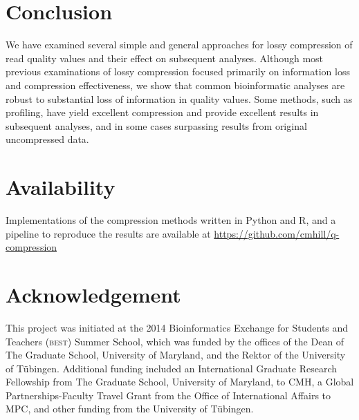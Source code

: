 \documentclass{bioinfo}
\begin{document}
%
%

\section{Conclusion}

We have examined several simple and general approaches for lossy
compression of read quality values and their effect on subsequent
analyses. Although most previous examinations of lossy compression
focused primarily on information loss and compression effectiveness,
we show that common bioinformatic analyses are robust to substantial
loss of information in quality values. Some methods, such as
profiling, have yield excellent compression and provide excellent
results in subsequent analyses, and in some cases surpassing results
from original uncompressed data.

\section{Availability}
Implementations of the compression methods written in Python and R,
and a pipeline to reproduce the results are available at
\url{https://github.com/cmhill/q-compression}

\section*{Acknowledgement}
This project was initiated at the 2014 Bioinformatics Exchange for
Students and Teachers (\textsc{best}) Summer School, which was funded
by the offices of the Dean of The Graduate School, University of
Maryland, and the Rektor of the University of T\"{u}bingen. Additional
funding included an International Graduate Research Fellowship from
The Graduate School, University of Maryland, to CMH, a Global
Partnerships-Faculty Travel Grant from the Office of International
Affairs to MPC, and other funding from the University of T\"{u}bingen.






%

%


\end{document}
